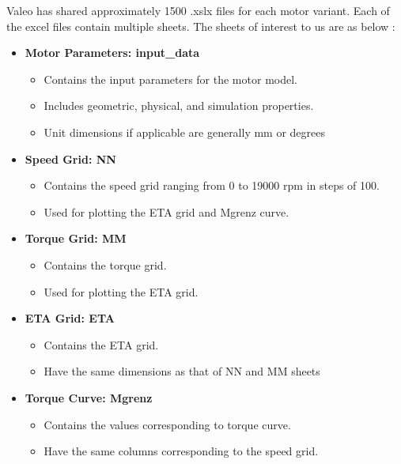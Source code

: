 \documentclass{report} %
\begin{document}
\newpage 

Valeo has shared approximately 1500 .xslx files for each motor variant. Each of the excel files contain multiple sheets.
The sheets of interest to us are as below :

\begin{itemize}
    \item \textbf{Motor Parameters: input\_data}
    \begin{itemize}
        \item Contains the input parameters for the motor model.
        \item Includes geometric, physical, and simulation properties.
        \item Unit dimensions if applicable are generally mm or degrees 
    \end{itemize}
    
    \item \textbf{Speed Grid: NN}
    \begin{itemize}
        \item Contains the speed grid ranging from 0 to 19000 rpm in steps of 100.
        \item Used for plotting the ETA grid and Mgrenz curve.
    \end{itemize}
    
    \item \textbf{Torque Grid: MM}
    \begin{itemize}
        \item Contains the torque grid.
        \item Used for plotting the ETA grid.
    \end{itemize}

    \item \textbf{ETA Grid: ETA}
    \begin{itemize}
        \item Contains the ETA grid.
        \item Have the same dimensions as that of NN and MM sheets
    \end{itemize}

    \item \textbf{Torque Curve: Mgrenz}
    \begin{itemize}
        \item Contains the values corresponding to torque curve.
        \item Have the same columns corresponding to the speed grid.
    \end{itemize}
\end{itemize}
\end{document}
